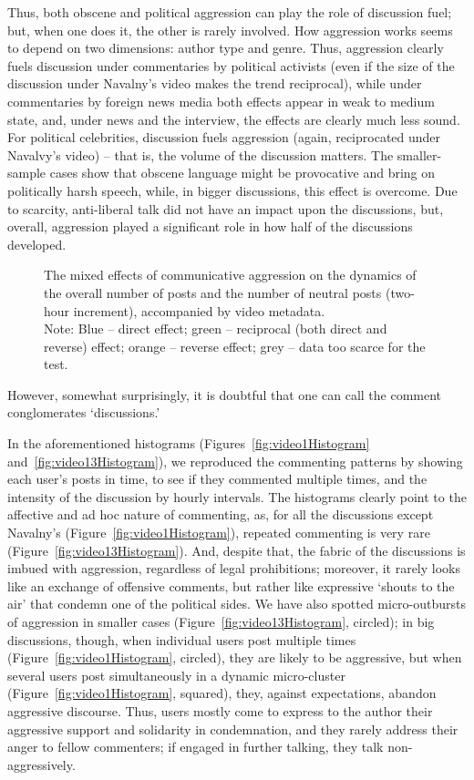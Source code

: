 Thus, both obscene and political aggression can play the role of discussion fuel; but, when one does it, the other is rarely involved. How aggression works seems to depend on two dimensions: author type and genre. Thus, aggression clearly fuels discussion under commentaries by political activists (even if the size of the discussion under Navalny’s video makes the trend reciprocal), while under commentaries by foreign news media both effects appear in weak to medium state, and, under news and the interview, the effects are clearly much less sound. For political celebrities, discussion fuels aggression (again, reciprocated under Navalvy’s video) -- that is, the volume of the discussion matters. The smaller-sample cases show that obscene language might be provocative and bring on politically harsh speech, while, in bigger discussions, this effect is overcome. Due to scarcity, anti-liberal talk did not have an impact upon the discussions, but, overall, aggression played a significant role in how half of the discussions developed.

\begin{figure}[ht]
	\caption{The mixed effects of communicative aggression on the dynamics of the overall number of posts and the number of neutral posts (two-hour increment), accompanied by video metadata.\\Note: Blue -- direct effect; green -- reciprocal (both direct and reverse) effect; orange -- reverse effect; grey -- data too scarce for the test.}\label{fig:communicativeAggressionMixedEffect}
\end{figure}

However, somewhat surprisingly, it is doubtful that one can call the comment conglomerates ‘discussions.’

In the aforementioned histograms (Figures~\cref{fig:video1Histogram} and~\cref{fig:video13Histogram}), we reproduced the commenting patterns by showing each user’s posts in time, to see if they commented multiple times, and the intensity of the discussion by hourly intervals. The histograms clearly point to the affective and ad hoc nature of commenting, as, for all the discussions except Navalny’s (Figure~\cref{fig:video1Histogram}), repeated commenting is very rare (Figure~\cref{fig:video13Histogram}). And, despite that, the fabric of the discussions is imbued with aggression, regardless of legal prohibitions; moreover, it rarely looks like an exchange of offensive comments, but rather like expressive ‘shouts to the air’ that condemn one of the political sides. We have also spotted micro-outbursts of aggression in smaller cases (Figure~\cref{fig:video13Histogram}, circled); in big discussions, though, when individual users post multiple times (Figure~\cref{fig:video1Histogram}, circled), they are likely to be aggressive, but when several users post simultaneously in a dynamic micro-cluster (Figure~\cref{fig:video1Histogram}, squared), they, against expectations, abandon aggressive discourse. Thus, users mostly come to express to the author their aggressive support and solidarity in condemnation, and they rarely address their anger to fellow commenters; if engaged in further talking, they talk non-aggressively.

